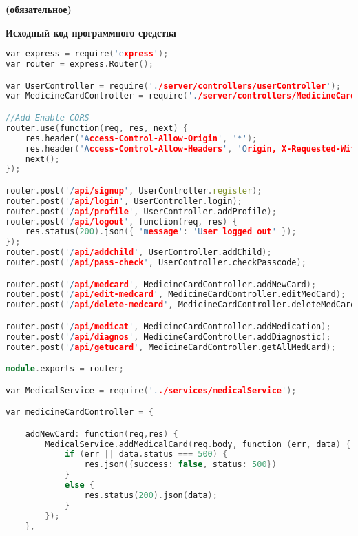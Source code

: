 \begin{center}
\vspace{-1em}
\textbf{ (обязательное)}

\textbf{Исходный код программного средства}
\end{center}


\begin{lstlisting}[language=C++, style=cplusplusstyle]
var express = require('express');
var router = express.Router();

var UserController = require('./server/controllers/userController');
var MedicineCardController = require('./server/controllers/MedicineCardController');

//Add Enable CORS
router.use(function(req, res, next) {
    res.header('Access-Control-Allow-Origin', '*');
    res.header('Access-Control-Allow-Headers', 'Origin, X-Requested-With, Content-Type, Accept');
    next();
});

router.post('/api/signup', UserController.register);
router.post('/api/login', UserController.login);
router.post('/api/profile', UserController.addProfile);
router.post('/api/logout', function(req, res) {
    res.status(200).json({ 'message': 'User logged out' });
});
router.post('/api/addchild', UserController.addChild);
router.post('/api/pass-check', UserController.checkPasscode);

router.post('/api/medcard', MedicineCardController.addNewCard);
router.post('/api/edit-medcard', MedicineCardController.editMedCard);
router.post('/api/delete-medcard', MedicineCardController.deleteMedCard);

router.post('/api/medicat', MedicineCardController.addMedication);
router.post('/api/diagnos', MedicineCardController.addDiagnostic);
router.post('/api/getucard', MedicineCardController.getAllMedCard);

module.exports = router;

var MedicalService = require('../services/medicalService');

var medicineCardController = {

    addNewCard: function(req,res) {
        MedicalService.addMedicalCard(req.body, function (err, data) {
            if (err || data.status === 500) {
                res.json({success: false, status: 500})
            }
            else {
                res.status(200).json(data);
            }
        });
    },


\end{lstlisting}
